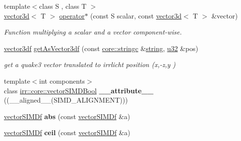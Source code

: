 \begin{DoxyCompactItemize}
\item 
{\footnotesize template$<$class S , class T $>$ }\\\hyperlink{classirr_1_1core_1_1vector3d}{vector3d}$<$ T $>$ \hyperlink{namespaceirr_1_1core_a169752e96cde0be366fd3d9efea44dc1}{operator$\ast$} (const S scalar, const \hyperlink{classirr_1_1core_1_1vector3d}{vector3d}$<$ T $>$ \&vector)\hypertarget{namespaceirr_1_1core_a169752e96cde0be366fd3d9efea44dc1}{}\label{namespaceirr_1_1core_a169752e96cde0be366fd3d9efea44dc1}

\begin{DoxyCompactList}\small\item\em Function multiplying a scalar and a vector component-\/wise. \end{DoxyCompactList}\item 
\hyperlink{namespaceirr_1_1core_a06f169d08b5c429f5575acb7edbad811}{vector3df} \hyperlink{namespaceirr_1_1core_a04d3e0aca42f469906fc96ec9a5f58f4}{get\+As\+Vector3df} (const \hyperlink{namespaceirr_1_1core_ade1071a878633f2f6d8a75c5d11fec19}{core\+::stringc} \&\hyperlink{classirr_1_1core_1_1string}{string}, \hyperlink{namespaceirr_a0416a53257075833e7002efd0a18e804}{u32} \&pos)\hypertarget{namespaceirr_1_1core_a04d3e0aca42f469906fc96ec9a5f58f4}{}\label{namespaceirr_1_1core_a04d3e0aca42f469906fc96ec9a5f58f4}

\begin{DoxyCompactList}\small\item\em get a quake3 vector translated to irrlicht position (x,-\/z,y ) \end{DoxyCompactList}\item 
{\footnotesize template$<$int components$>$ }\\class \hyperlink{classirr_1_1core_1_1vectorSIMDBool}{irr\+::core\+::vector\+S\+I\+M\+D\+Bool} {\bfseries \+\_\+\+\_\+attribute\+\_\+\+\_\+} ((\+\_\+\+\_\+aligned\+\_\+\+\_\+(S\+I\+M\+D\+\_\+\+A\+L\+I\+G\+N\+M\+E\+NT)))\hypertarget{namespaceirr_1_1core_a82a7602946cd8e5156dc960ec9133fdd}{}\label{namespaceirr_1_1core_a82a7602946cd8e5156dc960ec9133fdd}

\item 
\hyperlink{classirr_1_1core_1_1vectorSIMDf}{vector\+S\+I\+M\+Df} {\bfseries abs} (const \hyperlink{classirr_1_1core_1_1vectorSIMDf}{vector\+S\+I\+M\+Df} \&a)\hypertarget{namespaceirr_1_1core_a13a32851df3c459d5963396bae6c3272}{}\label{namespaceirr_1_1core_a13a32851df3c459d5963396bae6c3272}

\item 
\hyperlink{classirr_1_1core_1_1vectorSIMDf}{vector\+S\+I\+M\+Df} {\bfseries ceil} (const \hyperlink{classirr_1_1core_1_1vectorSIMDf}{vector\+S\+I\+M\+Df} \&a)\hypertarget{namespaceirr_1_1core_af79dd5587b068b58dfdd82af69c3e276}{}\label{namespaceirr_1_1core_af79dd5587b068b58dfdd82af69c3e276}


\end{DoxyCompactItemize}
